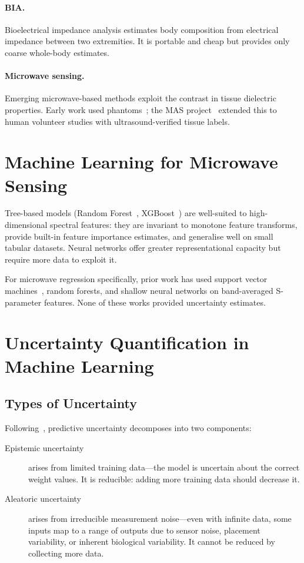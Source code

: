 \documentclass[12pt, a4paper, oneside]{report}
\begin{document}
\paragraph{BIA.} Bioelectrical impedance analysis estimates body composition from electrical impedance between two extremities. It is portable and cheap but provides only coarse whole-body estimates.

\paragraph{Microwave sensing.} Emerging microwave-based methods exploit the contrast in tissue dielectric properties. Early work used phantoms~\cite{sensors21}; the MAS project~\cite{mattsson2022} extended this to human volunteer studies with ultrasound-verified tissue labels.

\section{Machine Learning for Microwave Sensing}

Tree-based models (Random Forest~\cite{breiman2001}, XGBoost~\cite{chen2016}) are well-suited to high-dimensional spectral features: they are invariant to monotone feature transforms, provide built-in feature importance estimates, and generalise well on small tabular datasets. Neural networks offer greater representational capacity but require more data to exploit it.

For microwave regression specifically, prior work has used support vector machines~\cite{sensors21}, random forests, and shallow neural networks on band-averaged S-parameter features. None of these works provided uncertainty estimates.

\section{Uncertainty Quantification in Machine Learning}

\subsection{Types of Uncertainty}

Following~\cite{kendall2017}, predictive uncertainty decomposes into two components:

\begin{description}
  \item[Epistemic uncertainty] arises from limited training data---the model is uncertain about the correct weight values. It is reducible: adding more training data should decrease it.
  \item[Aleatoric uncertainty] arises from irreducible measurement noise---even with infinite data, some inputs map to a range of outputs due to sensor noise, placement variability, or inherent biological variability. It cannot be reduced by collecting more data.
\end{description}
\end{document}
